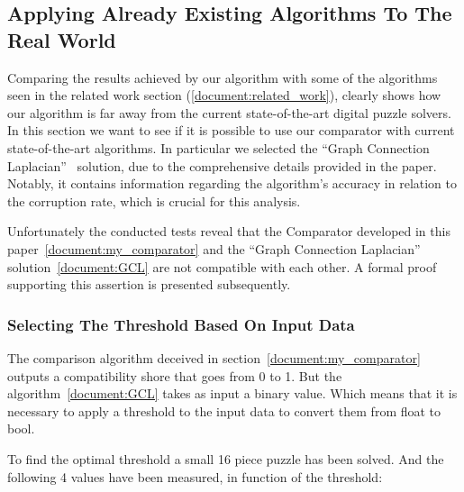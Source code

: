 \documentclass{article}
\begin{document}
\subsection{Applying Already Existing Algorithms To The Real World}

Comparing the results achieved by our algorithm with some of the algorithms seen in the related
work section (\cref{document:related_work}), clearly shows how our algorithm is far away
from the current state-of-the-art digital puzzle solvers. In this section we want to
see if it is possible to use our comparator with current state-of-the-art algorithms.
In particular we selected the ``Graph Connection Laplacian''~\cite{GCL} solution, due to the
comprehensive details provided in the paper. Notably, it contains information
regarding the algorithm's accuracy in relation to the corruption rate,
which is crucial for this analysis.

Unfortunately the conducted tests reveal that the Comparator developed
in this paper~\cref{document:my_comparator}
and the ``Graph Connection Laplacian'' solution~\cref{document:GCL}
are not compatible with each other.
A formal proof supporting this assertion is presented subsequently.


\subsubsection{Selecting The Threshold Based On Input Data}

The comparison algorithm deceived in section~\cref{document:my_comparator} outputs a compatibility
shore that goes from 0 to 1.\newline
But the algorithm~\cref{document:GCL} takes as input a binary value.
Which means that it is necessary to apply a threshold to the input
data to convert them from float to bool.

To find the optimal threshold a small 16 piece puzzle has been solved.
And the following 4 values have been measured, in function of the threshold:
\end{document}
